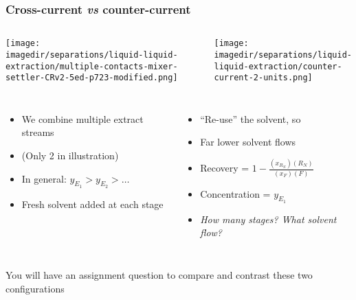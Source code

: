 \begin{frame}\frametitle{Cross-current \emph{vs} counter-current}
	\begin{columns}[t]
			{\color{myGreen}{Cross-current ($N=2$ stages)}}
			{\color{myGreen}{Counter-current ($N=2$ stages)}}
	\end{columns}
	\begin{columns}[t]
			\begin{center}
				\texttt{[image: \\imagedir/separations/liquid-liquid-extraction/multiple-contacts-mixer-settler-CRv2-5ed-p723-modified.png]}
			\end{center}
			\vspace{-12pt}
			\begin{center}
				\texttt{[image: \\imagedir/separations/liquid-liquid-extraction/counter-current-2-units.png]}
			\end{center}
	\end{columns}

	\begin{columns}[t]
			\begin{itemize}
				\item	We combine multiple extract streams
				\item	(Only 2 in illustration)
				\item	In general: $y_{E_1} > y_{E_2} > \ldots$
				\item	Fresh solvent added at each stage
			\end{itemize}
			\begin{itemize}
				\item	``Re-use'' the solvent, so
				\item	Far lower solvent flows
				\item	Recovery = 	\(1 - \displaystyle\frac{(x_{R_N})(R_N)}{(x_F) (F)}\)
				\item	Concentration = \(\displaystyle  y_{E_1}\)
				\item	{\color{brown}\emph{How many stages? What solvent flow?}}
			\end{itemize}
	\end{columns}
	\vspace{6pt}
	You will have an assignment question to compare and contrast these two configurations
\end{frame}

